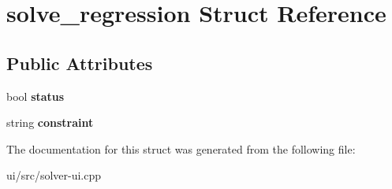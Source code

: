 \hypertarget{structsolve__regression}{\section{solve\-\_\-regression \-Struct \-Reference}
\label{structsolve__regression}
}
\subsection*{\-Public \-Attributes}
\begin{DoxyCompactItemize}
\item 
\hypertarget{structsolve__regression_a6af04b21aabcf1137c225dbbdbdaba4d}{bool {\bfseries status}}\label{structsolve__regression_a6af04b21aabcf1137c225dbbdbdaba4d}

\item 
\hypertarget{structsolve__regression_a503c2a5017d7f76ab7bdf0346f9efb43}{string {\bfseries constraint}}\label{structsolve__regression_a503c2a5017d7f76ab7bdf0346f9efb43}

\end{DoxyCompactItemize}


\-The documentation for this struct was generated from the following file\-:\begin{DoxyCompactItemize}
\item 
ui/src/solver-\/ui.\-cpp\end{DoxyCompactItemize}
